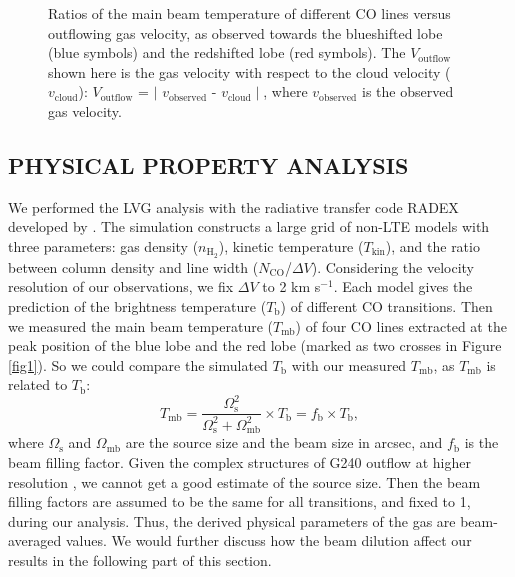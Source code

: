 \begin{figure}[tbp]
\caption{Ratios of the main beam temperature of different CO lines versus outflowing gas velocity, as observed towards the blueshifted lobe (blue symbols) and the redshifted lobe (red symbols). The $V_{\mathrm{outflow}}$ shown here is the gas velocity with respect to the cloud velocity ($v_{\mathrm{cloud}}$): $V_{\mathrm{outflow}}$ = $\mid$ $v_{\mathrm{observed}}$ - $v_{\mathrm{cloud}}\mid$, where $v_{\mathrm{observed}}$ is the observed gas velocity. \label{fig2}}
\end{figure}

\subsection{PHYSICAL PROPERTY ANALYSIS}
We performed the LVG analysis with the radiative transfer code RADEX developed by \citet{2007A&A...468..627V}. The simulation constructs a large grid of non-LTE models with three parameters: gas density ($n_{\mathrm{H}_2}$), kinetic temperature ($T_{\mathrm{kin}}$), and the ratio between column density and line width ($N_{\mathrm{CO}}$/$\Delta V$). Considering the velocity resolution of our observations, we fix $\Delta V$ to 2 km s$^{-1}$. Each model gives the prediction of the brightness temperature ($T_\mathrm{b}$) of different CO transitions. Then we measured the main beam temperature ($T_{\mathrm{mb}}$) of four CO lines extracted at the peak position of the blue lobe and the red lobe (marked as two crosses in Figure \ref{fig1}). So we could compare the simulated $T_\mathrm{b}$ with our measured $T_{\mathrm{mb}}$, as $T_{\mathrm{mb}}$ is related to $T_\mathrm{b}$:
\begin{equation}
T_{\mathrm{mb}} = \frac{\Omega_{\mathrm{s}}^2}{\Omega_{\mathrm{s}}^2+\Omega_{\mathrm{mb}}^2}\times T_\mathrm{b} = f_{\mathrm{b}} \times T_\mathrm{b},
\end{equation}
where $\Omega_{\mathrm{s}}$ and $\Omega_{\mathrm{mb}}$ are the source size and the beam size in arcsec, and $f_{\mathrm{b}}$ is the beam filling factor. Given the complex structures of G240 outflow at higher resolution \citep{2009ApJ...696...66Q}, we cannot get a good estimate of the source size. Then the beam filling factors are assumed to be the same for all transitions, and fixed to 1, during our analysis. Thus, the derived physical parameters of the gas are beam-averaged values. We would further discuss how the beam dilution affect our results in the following part of this section.

